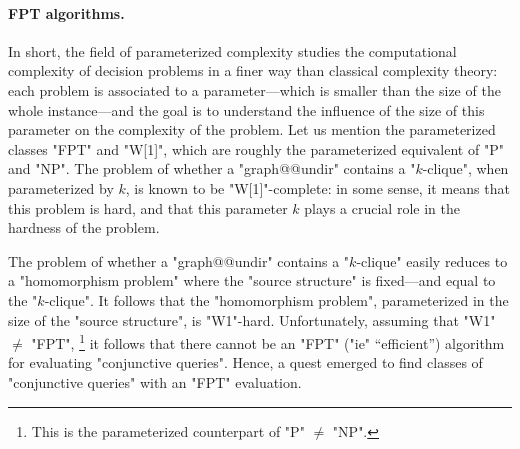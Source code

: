 \paragraph*{FPT algorithms.}
In short, the field of parameterized complexity
studies the computational complexity of decision problems
in a finer way than classical complexity theory: each problem
is associated to a parameter---which is smaller than the size of the whole instance---and
the goal is to understand the influence of the size of this parameter on the
complexity of the problem.
Let us mention the parameterized classes "FPT" and "W[1]", which are roughly
the parameterized equivalent of "P" and "NP".
The problem of whether a "graph@@undir" contains a "$k$-clique",
when parameterized by $k$, is known to be "W[1]"-complete:
in some sense, it means that this problem is hard, and that
this parameter $k$ plays a crucial role in the hardness of the problem.

The problem of whether a "graph@@undir" contains a "$k$-clique" easily reduces to a
"homomorphism problem" where the "source structure" is fixed---and equal to the "$k$-clique".
It follows that the "homomorphism problem", parameterized in the
size of the "source structure", is "W1"-hard. Unfortunately, assuming that "W1" $\neq$ "FPT",%
\footnote{This is the parameterized counterpart of "P" $\neq$ "NP".}
it follows that there cannot be an "FPT" ("ie" ``efficient'')
algorithm for evaluating "conjunctive queries".
Hence, a quest emerged to find classes of "conjunctive queries" with an "FPT" evaluation.

